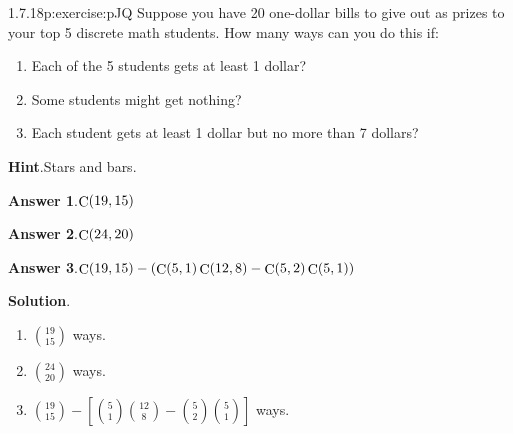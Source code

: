 \documentclass[twoside,11pt,]{book}
\newcommand{\blocktitlefont}{\relax}
\numberwithin{equation}{chapter}
\begin{document}
\begin{divisionsolution}{1.7.18}{}{p:exercise:pJQ}%
Suppose you have 20 one-dollar bills to give out as prizes to your top 5 discrete math students. How many ways can you do this if:%
\begin{enumerate}[label=(\alph*)]
\item{}Each of the 5 students gets at least 1 dollar?%
\item{}Some students might get nothing?%
\item{}Each student gets at least 1 dollar but no more than 7 dollars?%
\end{enumerate}
%
\par\smallskip%
\noindent\textbf{\blocktitlefont Hint}.\quad{}Stars and bars.%
\par\smallskip%
\noindent\textbf{\blocktitlefont Answer 1}.\quad{}\(\mathop{\rm C}\nolimits\!\left(19,15\right)\)%
\par\smallskip%
\noindent\textbf{\blocktitlefont Answer 2}.\quad{}\(\mathop{\rm C}\nolimits\!\left(24,20\right)\)%
\par\smallskip%
\noindent\textbf{\blocktitlefont Answer 3}.\quad{}\(\mathop{\rm C}\nolimits\!\left(19,15\right)-\left(\mathop{\rm C}\nolimits\!\left(5,1\right)\mathop{\rm C}\nolimits\!\left(12,8\right)-\mathop{\rm C}\nolimits\!\left(5,2\right)\mathop{\rm C}\nolimits\!\left(5,1\right)\right)\)%
\par\smallskip%
\noindent\textbf{\blocktitlefont Solution}.\quad{}%
\begin{enumerate}[label=(\alph*)]
\item{}\({19 \choose 15}\) ways.%
\item{}\({24 \choose 20}\) ways.%
\item{}\({19 \choose 15} - \left[{5 \choose 1}{12 \choose 8} - {5 \choose 2}{5 \choose 1} \right]\) ways.%
\end{enumerate}
%
\end{divisionsolution}%
\end{document}
